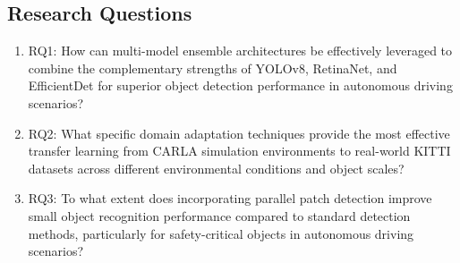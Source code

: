 \documentclass[conference]{IEEEtran}
\begin{document}
\subsection{Research Questions}
\begin{enumerate}
    \item RQ1: How can multi-model ensemble architectures be effectively leveraged to combine the complementary strengths of YOLOv8, RetinaNet, and EfficientDet for superior object detection performance in autonomous driving scenarios?
    \item RQ2: What specific domain adaptation techniques provide the most effective transfer learning from CARLA simulation environments to real-world KITTI datasets across different environmental conditions and object scales?
    \item RQ3: To what extent does incorporating parallel patch detection improve small object recognition performance compared to standard detection methods, particularly for safety-critical objects in autonomous driving scenarios?
\end{enumerate}
\end{document}
